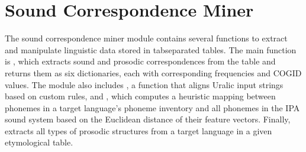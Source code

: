 \documentclass[letterpaper,10pt,english]{sphinxmanual}
\begin{document}
\section{Sound Correspondence Miner}
\label{\detokenize{documentation:module-loanpy.scminer}}\label{\detokenize{documentation:sound-correspondence-miner}}
\sphinxAtStartPar
The sound correspondence miner module contains several functions to
extract and manipulate linguistic data stored in tab\sphinxhyphen{}separated tables.
The main function is , which extracts sound and prosodic
correspondences from the table and returns them as six dictionaries, each
with corresponding frequencies and COGID values. The module also includes
, a function that aligns Uralic input strings based on custom
rules, and , which computes a heuristic mapping between phonemes
in a target language’s phoneme inventory and all phonemes in the IPA sound
system based on the Euclidean distance of their feature vectors. Finally,
 extracts all types of prosodic structures
from a target language in a given etymological table.
\end{document}
